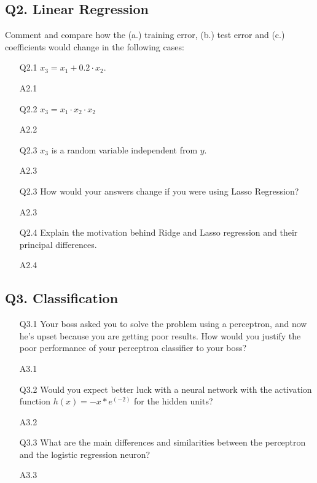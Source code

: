 \documentclass[tikz,14pt,fleqn]{article}
\begin{document}
\subsection{Q2. Linear Regression}
Comment and compare how the (a.) training error, (b.) test error and (c.) coefficients would change in the following cases:
\begin{itemize}
\item[Q2.1] $x_3 = x_1 + 0.2 \cdot x_2$.
\item[A2.1] ~\\

\item[Q2.2] $x_3 = x_1 \cdot x_2 \cdot x_2$
\item[A2.2] ~\\

\item[Q2.3] $x_3$ is a random variable independent from $y$.
\item[A2.3] ~\\

\item[Q2.3] How would your answers change if you were using Lasso Regression?
\item[A2.3] ~\\

\item[Q2.4] Explain the motivation behind Ridge and Lasso regression and their principal differences.
\item[A2.4] ~\\  
\end{itemize}

\subsection{Q3. Classification}
\begin{itemize}
\item[Q3.1] Your boss asked you to solve the problem using a perceptron, and now he's upset because you are getting poor results. How would you justify the poor performance of your perceptron classifier to your boss?
\item[A3.1] ~\\

\item[Q3.2] Would you expect better luck with a neural network with the activation function $h(x) = - x * e^(-2)$ for the hidden units?
\item[A3.2] ~\\

\item[Q3.3] What are the main differences and similarities between the perceptron and the logistic regression neuron?
\item[A3.3] ~\\

\end{itemize}
\end{document}
